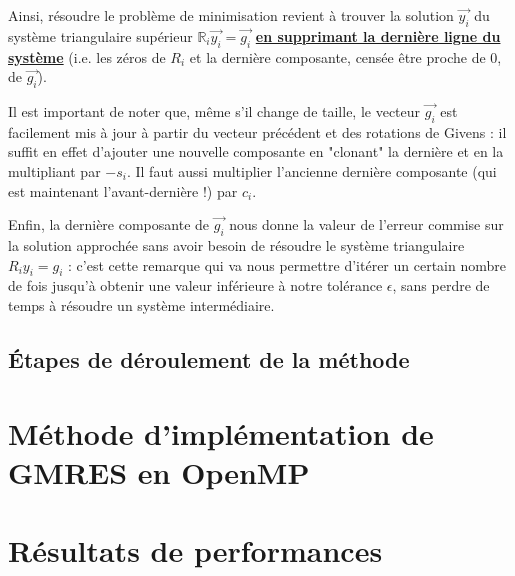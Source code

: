 \documentclass[11pt,a4paper,oneside]{memoir}
\newcommand{\R}{\mathbb{R}}	\newcommand{\Q}{\mathbb{Q}}	\newcommand{\C}{\mathbb{C}}
\theoremstyle{definition}
\theoremstyle{remark}
\theoremstyle{plain}
\begin{document}
Ainsi, résoudre le problème de minimisation revient à trouver la solution $\vec{y_i}$ du système triangulaire supérieur $\R_i \vec{y_i} = \vec{g_i}$ \underline{\textbf{en supprimant la dernière ligne du système}} (i.e. les zéros de $R_i$ et la dernière composante, censée être proche de 0, de $\vec{g_i}$).

Il est important de noter que, même s'il change de taille, le vecteur $\vec{g_i}$ est facilement mis à jour à partir du vecteur précédent et des rotations de Givens : il suffit en effet d'ajouter une nouvelle composante en "clonant" la dernière et en la multipliant par $-s_i$. Il faut aussi multiplier l'ancienne dernière composante (qui est maintenant l'avant-dernière !) par $c_i$.\medskip

Enfin, la dernière composante de $\vec{g_i}$ nous donne la valeur de l'erreur commise sur la solution approchée sans avoir besoin de résoudre le système triangulaire $R_i y_i = g_i$ : c'est cette remarque qui va nous permettre d'itérer un certain nombre de fois jusqu'à obtenir une valeur inférieure à notre tolérance $\epsilon$, sans perdre de temps à résoudre un système intermédiaire.


\subsection{\'Etapes de déroulement de la méthode}




\section{Méthode d'implémentation de GMRES en OpenMP}



\section{Résultats de performances}
\end{document}
